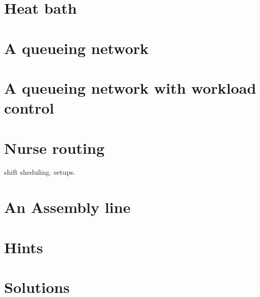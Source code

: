 \documentclass{scrartcl}
\begin{document}
\section{Heat bath}
\label{sec:heat-bath}


\section{A queueing network}
\label{sec:queueing-network}


\section{A queueing network with workload control}
\label{sec:queu-netw-with}


\section{Nurse routing}
\label{sec:nurse-routing}

shift sheduling. setups. 


\section{An Assembly line}
\label{sec:an-assembly-line}





\clearpage
\section*{Hints}


\clearpage
\section*{Solutions}

\end{document}

